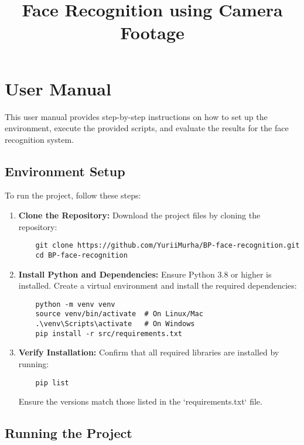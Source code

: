 \documentclass[a4paper]{feidippp}
\title{Face Recognition using Camera Footage}
\begin{document}


\titulnastrana

\tableofcontents

\newpage
\setcounter{page}{1}
\section{User Manual}

This user manual provides step-by-step instructions on how to set up the environment, execute the provided scripts, and evaluate the results for the face recognition system.

\subsection{Environment Setup}

To run the project, follow these steps:

\begin{enumerate}
    \item \textbf{Clone the Repository:}
    Download the project files by cloning the repository:
    \begin{verbatim}
    git clone https://github.com/YuriiMurha/BP-face-recognition.git
    cd BP-face-recognition
    \end{verbatim}

    \item \textbf{Install Python and Dependencies:}
    Ensure Python 3.8 or higher is installed. Create a virtual environment and install the required dependencies:
    \begin{verbatim}
    python -m venv venv
    source venv/bin/activate  # On Linux/Mac
    .\venv\Scripts\activate   # On Windows
    pip install -r src/requirements.txt
    \end{verbatim}

    \item \textbf{Verify Installation:}
    Confirm that all required libraries are installed by running:
    \begin{verbatim}
    pip list
    \end{verbatim}
    Ensure the versions match those listed in the `requirements.txt` file.
\end{enumerate}

\subsection{Running the Project}
\end{document}
